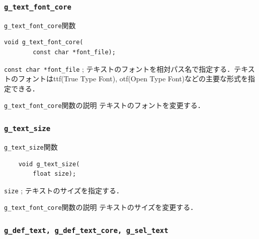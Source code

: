 \documentclass[platex,a4paper,12pt]{jsarticle}%
\begin{document}
\subsubsection{\texttt{g\_text\_font\_core}}

\begin{itembox}[l]{\texttt{g\_text\_font\_core}関数}
\begin{verbatim}
void g_text_font_core(
        const char *font_file);
\end{verbatim}
\verb|const char *font_file| ; テキストのフォントを相対パス名で指定する．テキストのフォントはttf(True Type Font), otf(Open Type Font)などの主要な形式を指定できる．\\
\end{itembox}

\begin{itembox}[l]{\texttt{g\_text\_font\_core}関数の説明}
テキストのフォントを変更する．
\end{itembox}

\subsubsection{\texttt{g\_text\_size}}

\begin{itembox}[l]{\texttt{g\_text\_size}関数}
	\begin{verbatim}
	void g_text_size(
        float size);
	\end{verbatim}
	\verb|size| ; テキストのサイズを指定する．
\end{itembox}

\begin{itembox}[l]{\texttt{g\_text\_font\_core}関数の説明}
	テキストのサイズを変更する．
\end{itembox}


\clearpage
\subsubsection{\texttt{g\_def\_text, g\_def\_text\_core, g\_sel\_text}}
\end{document}
